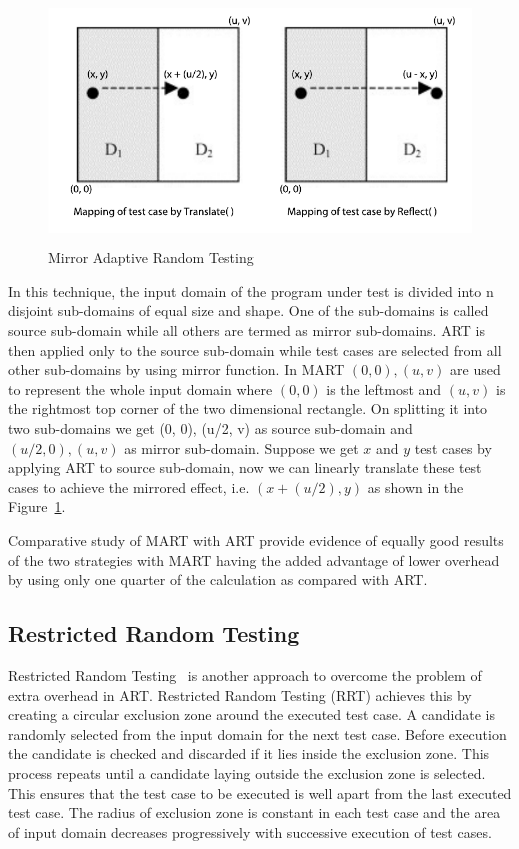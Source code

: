 \begin{figure}[h]
\begin{center}
	\includegraphics[width=13.5cm, height=6.5cm ]{chapter3/mart2.pdf}
	\caption{Mirror Adaptive Random Testing~\cite{Chen2003}}
\label{fig:mirrorART}
\end{center}  
\end{figure}

In this technique, the input domain of the program under test is divided into n disjoint sub-domains of equal size and shape. One of the sub-domains is called source sub-domain while all others are termed as mirror sub-domains. ART is then applied only to the source sub-domain while test cases are selected from all other sub-domains by using mirror function. In MART $(0, 0), (u, v)$ are used to represent the whole input domain where $(0, 0)$ is the leftmost and $(u, v)$ is the rightmost top corner of the two dimensional rectangle. On splitting it into two sub-domains we get {(0, 0), (u/2, v)} as source sub-domain and $(u/2, 0), (u, v)$ as mirror sub-domain. Suppose we get $x$ and $y$ test cases by applying ART to source sub-domain, now we can linearly translate these test cases to achieve the mirrored effect, i.e. $(x + (u/2), y)$ as shown in the Figure~\ref{fig:mirrorART}. 

Comparative study of MART with ART provide evidence of equally good results of the two strategies with MART having the added advantage of lower overhead by using only one quarter of the calculation as compared with ART.


\subsection{Restricted Random Testing}
Restricted Random Testing~\cite{chan2003normalized} is another approach to overcome the problem of extra overhead in ART. Restricted Random Testing (RRT) achieves this by creating a circular exclusion zone around the executed test case. A candidate is randomly selected from the input domain for the next test case. Before execution the candidate is checked and discarded if it lies inside the exclusion zone. This process repeats until a candidate laying outside the exclusion zone is selected. This ensures that the test case to be executed is well apart from the last executed test case. The radius of exclusion zone is constant in each test case and the area of input domain decreases progressively with successive execution of test cases.

